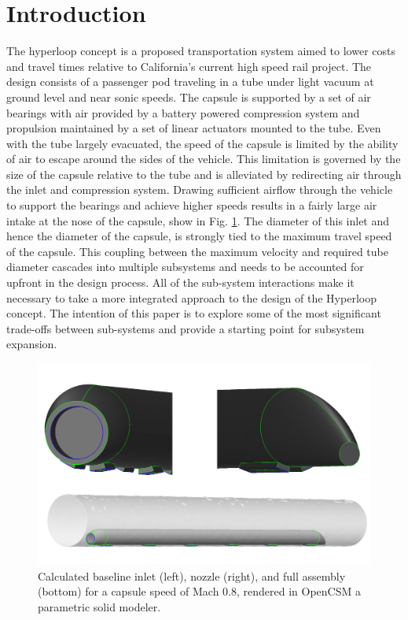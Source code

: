 \documentclass[heading.tex]{subfiles}
\begin{document}
\section{Introduction}

The hyperloop concept is a proposed transportation system aimed to lower costs and travel times relative to California's current high speed
 rail project. \cite{Musk} The design consists of a passenger pod traveling in a tube under light vacuum at ground level and near sonic
speeds. The capsule is supported by a set of air bearings with air provided by a battery powered compression system and propulsion maintained
by a set of linear actuators mounted to the tube. Even with the tube largely evacuated, the speed of the capsule is limited by the ability of air to
escape around the sides of the vehicle. This limitation is governed by the size of the capsule relative to the tube and is alleviated by redirecting air
through the inlet and compression system. Drawing sufficient airflow through the vehicle to support the bearings and achieve higher speeds results
in a fairly large air intake at the nose of the capsule, show in Fig. \ref{f:hyperloopCAD}. The diameter of this inlet and hence the diameter of the
capsule, is strongly tied to the maximum travel speed of the capsule. This coupling between the maximum velocity and
required tube diameter cascades into multiple subsystems and needs to be accounted for upfront in the design process. 
All of the sub-system interactions make it necessary to take a more integrated approach to the design of the Hyperloop concept. The intention of
this paper is to explore some of the most significant trade-offs between sub-systems and provide a starting point for subsystem expansion.

\begin{figure}[hbtp]
\centering
\includegraphics[scale=0.25]{images/hyperloop_cad.png}
\caption{Calculated baseline inlet (left), nozzle (right), and full assembly (bottom) for a capsule speed of Mach 0.8, rendered in OpenCSM a parametric solid modeler.}
\label{f:hyperloopCAD}
\end{figure}
\end{document}
